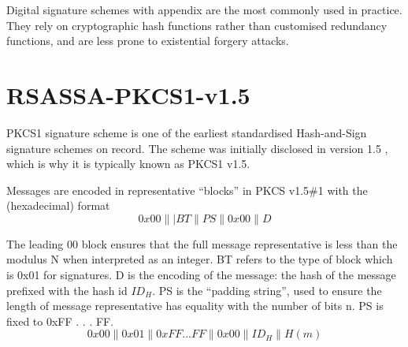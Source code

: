 \documentclass[]{final_report}
\theoremstyle{definition}
\begin{document}
Digital signature schemes with appendix are the most commonly used in practice. They rely on cryptographic hash functions rather than customised redundancy functions, and are less prone to existential forgery attacks.


\section{RSASSA-PKCS1-v1.5}
PKCS1 signature scheme is one of the earliest standardised Hash-and-Sign signature schemes on record. The scheme was initially disclosed in version 1.5 \cite{rfc2313}, which is why it is typically known as PKCS1 v1.5.

Messages are encoded in representative “blocks” in PKCS v1.5\#1 with the (hexadecimal) format
\[0x00\||BT\|PS\|0x00\|D\]

The leading 00 block ensures that the full message representative is less than the modulus N when interpreted as an integer. BT refers to the type of block which is 0x01 for signatures. D is the encoding of the message: the hash of the message prefixed with the hash id $ID_{H}$. PS is the “padding string”, used to ensure the length of message representative has equality with the number of bits n. PS is fixed to 0xFF . . . FF.
\[0x00\|0x01\|0xFF . . . FF\|0x00\|ID_{H}\|H(m)\]
\end{document}
